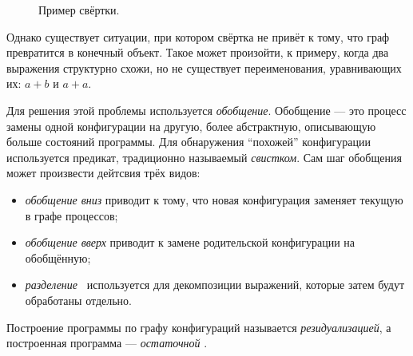 \begin{figure}[h!]
\center
{}

\label{fig:pgraphFoldingExample}
\caption{Пример свёртки.}
\end{figure}

Однако существует ситуации, при котором свёртка не привёт к тому, что граф превратится в
конечный объект. Такое может произойти, к примеру, когда два выражения структурно
схожи, но не существует переименования, уравнивающих их: $a + b$ и $a + a$.

Для решения этой проблемы используется \emph{обобщение}\cite{scGen}. Обобщение --- это процесс
замены одной конфигурации на другую, более абстрактную, описывающую больше состояний
программы. Для обнаружения ``похожей'' конфигурации используется предикат,
традиционно называемый \emph{свистком}. Сам шаг обобщения может произвести дейтсвия трёх видов:
\begin{itemize}
\item \emph{обобщение вниз} приводит к тому, что новая конфигурация заменяет текущую в графе процессов;
\item \emph{обобщение вверх} приводит к замене родительской конфигурации на обобщённую;
\item \emph{разделение}~ используется для декомпозиции выражений, которые затем
будут обработаны отдельно.
\end{itemize}


Построение программы по графу конфигураций называется \emph{резидуализацией}, а
построенная программа --- \emph{остаточной} .

